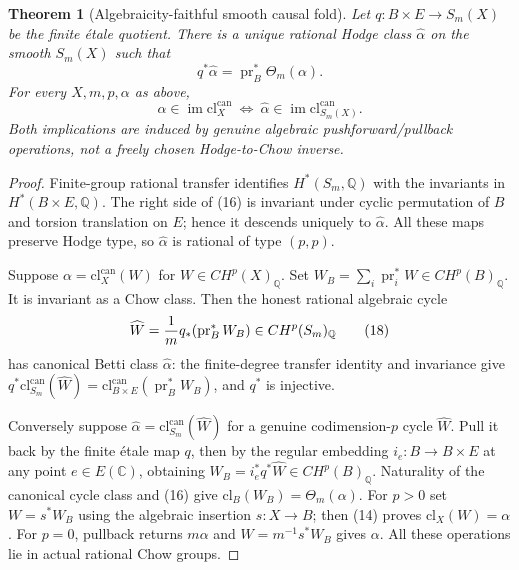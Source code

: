 \documentclass[11pt]{article}
\newtheorem{theorem}{Theorem}
\begin{document}
\begin{theorem}[Algebraicity-faithful smooth causal fold]
Let $q:B\times E\to S_m(X)$ be the finite \'etale quotient.
There is a unique rational Hodge class $\widehat\alpha$
on the \emph{smooth} $S_m(X)$ such that
\[
 q^*\widehat\alpha=\operatorname{pr}_B^*\Theta_m(\alpha).
 \tag{16}
\]
For every $X,m,p,\alpha$ as above,
\[
 \boxed{\quad
 \alpha\in\operatorname{im}\mathrm{cl}^{\mathrm{can}}_X
 \ \Longleftrightarrow\
 \widehat\alpha\in\operatorname{im}\mathrm{cl}^{\mathrm{can}}_{S_m(X)}.
 \quad}                                                \tag{17}
\]
Both implications are induced by genuine algebraic
pushforward/pullback operations, not a freely chosen
Hodge-to-Chow inverse.
\end{theorem}
\begin{proof}
Finite-group rational transfer identifies $H^*(S_m,\mathbb Q)$
with the invariants in $H^*(B\times E,\mathbb Q)$.
The right side of (16) is invariant under cyclic permutation
of $B$ and torsion translation on $E$; hence it descends
uniquely to $\widehat\alpha$.  All these maps preserve
Hodge type, so $\widehat\alpha$ is rational of type $(p,p)$.

Suppose $\alpha=\mathrm{cl}^{\mathrm{can}}_X(W)$ for
$W\in CH^p(X)_{\mathbb Q}$. Set
$W_B=\sum_i\operatorname{pr}_i^*W\in CH^p(B)_{\mathbb Q}$.
It is invariant as a Chow class. Then the honest rational
algebraic cycle
\[
       \widehat W={1\over m}q_*
            (\operatorname{pr}_B^*W_B)
       \in CH^p(S_m)_{\mathbb Q}
                                                               \tag{18}
\]
has canonical Betti class $\widehat\alpha$:
the finite-degree transfer identity and invariance give
$q^*\mathrm{cl}_{S_m}^{\mathrm{can}}(\widehat W)
=\mathrm{cl}_{B\times E}^{\mathrm{can}}
 (\operatorname{pr}_B^*W_B)$, and $q^*$ is injective.

Conversely suppose $\widehat\alpha
=\mathrm{cl}_{S_m}^{\mathrm{can}}(\widehat W)$ for a
genuine codimension-$p$ cycle $\widehat W$.
Pull it back by the finite \'etale map $q$, then by the
regular embedding $i_e:B\to B\times E$ at any
point $e\in E(\mathbb C)$, obtaining
$W_B=i_e^*q^*\widehat W\in CH^p(B)_{\mathbb Q}$.
Naturality of the canonical cycle class and (16) give
$\mathrm{cl}_B(W_B)=\Theta_m(\alpha)$.
For $p>0$ set $W=s^*W_B$ using the algebraic
insertion $s:X\to B$; then (14) proves
$\mathrm{cl}_X(W)=\alpha$.
For $p=0$, pullback returns $m\alpha$ and
$W=m^{-1}s^*W_B$ gives $\alpha$.
All these operations lie in actual rational Chow groups.
\end{proof}
\end{document}
